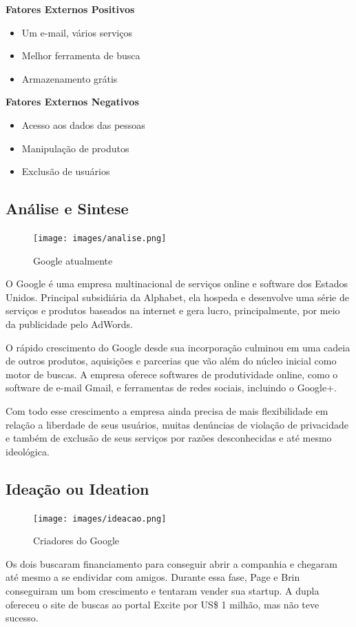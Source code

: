 \documentclass[a4paper]{article}
\begin{document}
\par \textbf{\large Fatores Externos Positivos}
\begin{itemize}
    \item Um e-mail, vários serviços
    \item Melhor ferramenta de busca
    \item Armazenamento grátis
\end{itemize}

\par \textbf{\large Fatores Externos Negativos}
\begin{itemize}
    \item Acesso aos dados das pessoas
    \item Manipulação de produtos
    \item Exclusão de usuários
\end{itemize}

\subsection{Análise e Sintese} 
\begin{figure}[H]
    \centering
    \texttt{[image: images/analise.png]}\\[0.5cm]
    \caption{Google atualmente}
\end{figure}
\par O Google é uma empresa multinacional de serviços online e software dos Estados Unidos. Principal subsidiária da Alphabet, ela hospeda e desenvolve uma série de serviços e produtos baseados na internet e gera lucro, principalmente, por meio da publicidade pelo AdWords.
\par O rápido crescimento do Google desde sua incorporação culminou em uma cadeia de outros produtos, aquisições e parcerias que vão além do núcleo inicial como motor de buscas. A empresa oferece softwares de produtividade online, como o software de e-mail Gmail, e ferramentas de redes sociais, incluindo o Google+.
\par Com todo esse crescimento a empresa ainda precisa de mais flexibilidade em relação a liberdade de seus usuários, muitas denúncias de violação de privacidade e também de exclusão de seus serviços por razões desconhecidas e até mesmo ideológica.

\subsection{Ideação ou Ideation}
\begin{figure}[h]
    \centering
    \texttt{[image: images/ideacao.png]}\\[0.5cm]
    \caption{Criadores do Google}
\end{figure}
\par Os dois buscaram financiamento para conseguir abrir a companhia e chegaram até mesmo a se endividar com amigos. Durante essa fase, Page e Brin conseguiram um bom crescimento e tentaram vender sua startup. A dupla ofereceu o site de buscas ao portal Excite por US\$ 1 milhão, mas não teve sucesso.
\end{document}
